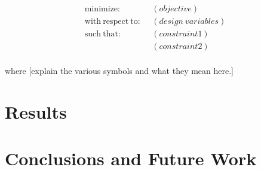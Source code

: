 \documentclass[journal]{new-aiaa} %
\begin{document}

\begin{equation} %
\label{eqn:optimization_problem} %
	\begin{aligned}
		\mathrm{minimize:~~} & (objective) \\ %
		\mathrm{with~respect~to:~~} & (design~variables) \\ %
		\mathrm{such~that:~~} & (constraint1) \\ %
					   & (constraint2) \\ %
	\end{aligned}
\end{equation}

\noindent where [explain the various symbols and what they mean here.]


\section{Results}
\label{sec:results}









\section{Conclusions and Future Work}
\label{sec:conclusions}
\end{document}
